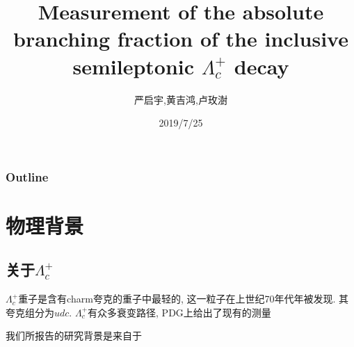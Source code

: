 \documentclass{beamer}
\title{Measurement of the absolute branching fraction of the inclusive semileptonic $\Lambda_c^+$ decay}
\author{严启宇,黄吉鸿,卢玫澍}
\institute{UCAS}
\date{2019/7/25}
\begin{document}

\begin{frame}
    \titlepage
\end{frame}

\begin{frame}
    \frametitle{Outline}
    \tableofcontents
\end{frame}

\section{物理背景}
\subsection{关于$\Lambda_c^+$}
\begin{frame}
    \subsectionpage
\end{frame}

\begin{frame}
    $\Lambda_c^+$重子是含有charm夸克的重子中最轻的, 这一粒子在上世纪70年代年被发现.\cite{knapp1976observation}\cite{abrams1980observation} 其夸克组分为$udc$. $\Lambda_c^+$有众多衰变路径, PDG上给出了现有的测量

    我们所报告的研究\cite{ablikim2018measurement}背景是来自于
\end{frame}


\begin{frame}[allowframebreaks]
    
\end{frame}
\end{document}
